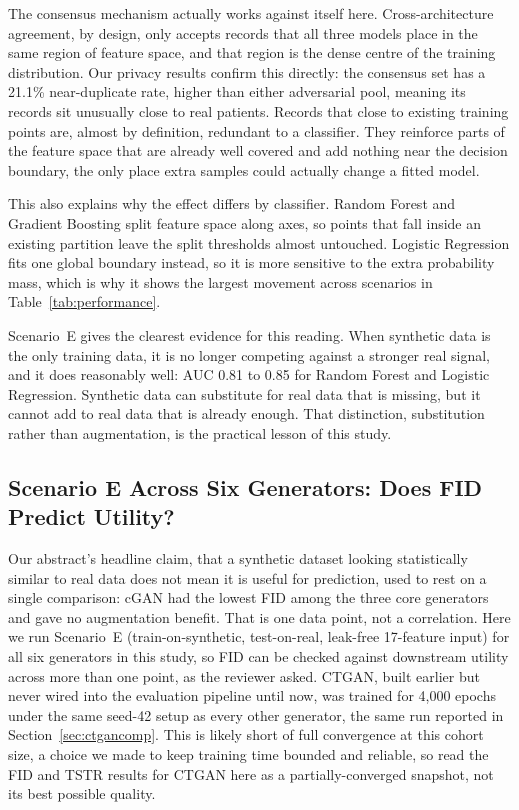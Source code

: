 \documentclass[journal]{IEEEtran}
\begin{document}
The consensus mechanism actually works against itself here. Cross-architecture agreement, by design, only accepts records that all three models place in the same region of feature space, and that region is the dense centre of the training distribution. Our privacy results confirm this directly: the consensus set has a 21.1\% near-duplicate rate, higher than either adversarial pool, meaning its records sit unusually close to real patients. Records that close to existing training points are, almost by definition, redundant to a classifier. They reinforce parts of the feature space that are already well covered and add nothing near the decision boundary, the only place extra samples could actually change a fitted model.

This also explains why the effect differs by classifier. Random Forest and Gradient Boosting split feature space along axes, so points that fall inside an existing partition leave the split thresholds almost untouched. Logistic Regression fits one global boundary instead, so it is more sensitive to the extra probability mass, which is why it shows the largest movement across scenarios in Table~\ref{tab:performance}.

Scenario~E gives the clearest evidence for this reading. When synthetic data is the only training data, it is no longer competing against a stronger real signal, and it does reasonably well: AUC 0.81 to 0.85 for Random Forest and Logistic Regression. Synthetic data can substitute for real data that is missing, but it cannot add to real data that is already enough. That distinction, substitution rather than augmentation, is the practical lesson of this study.

\subsection{Scenario E Across Six Generators: Does FID Predict Utility?}
\label{sec:sixgen}

Our abstract's headline claim, that a synthetic dataset looking statistically similar to real data does not mean it is useful for prediction, used to rest on a single comparison: cGAN had the lowest FID among the three core generators and gave no augmentation benefit. That is one data point, not a correlation. Here we run Scenario~E (train-on-synthetic, test-on-real, leak-free 17-feature input) for all six generators in this study, so FID can be checked against downstream utility across more than one point, as the reviewer asked. CTGAN, built earlier but never wired into the evaluation pipeline until now, was trained for 4,000 epochs under the same seed-42 setup as every other generator, the same run reported in Section~\ref{sec:ctgancomp}. This is likely short of full convergence at this cohort size, a choice we made to keep training time bounded and reliable, so read the FID and TSTR results for CTGAN here as a partially-converged snapshot, not its best possible quality.
\end{document}
